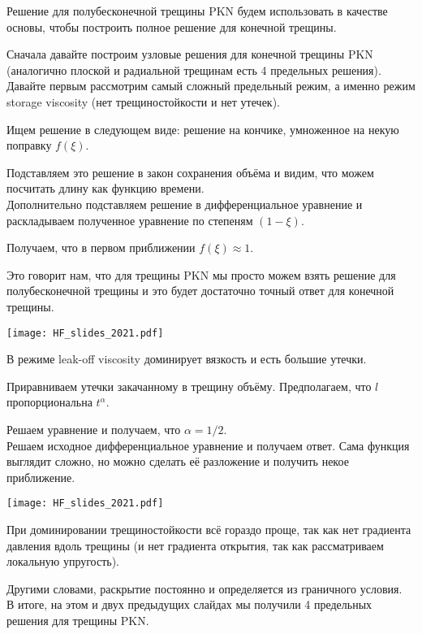 \documentclass[main.tex]{subfiles}
\begin{document}
Решение для полубесконечной трещины PKN будем использовать в качестве основы, чтобы построить полное решение для конечной трещины.

Сначала давайте построим узловые решения для конечной трещины PKN (аналогично плоской и радиальной трещинам есть 4 предельных решения).
\\

Давайте первым рассмотрим самый сложный предельный режим, а именно режим storage viscosity (нет трещиностойкости и нет утечек).

Ищем решение в следующем виде: решение на кончике, умноженное на некую поправку $f(\xi)$.

Подставляем это решение в закон сохранения объёма и видим, что можем посчитать длину как функцию времени.
\\

Дополнительно подставляем решение в дифференциальное уравнение и раскладываем полученное уравнение по степеням $(1-\xi)$.

Получаем, что в первом приближении $f(\xi)\approx1$.

Это говорит нам, что для трещины PKN мы просто можем взять решение для полубесконечной трещины и это будет достаточно точный ответ для конечной трещины.

\texttt{[image: HF\_slides\_2021.pdf]}

В режиме leak-off viscosity доминирует вязкость и есть большие утечки.

Приравниваем утечки закачанному в трещину объёму.
Предполагаем, что $l$ пропорциональна $t^\alpha$.

Решаем уравнение и получаем, что $\alpha=1/2$.
\\

Решаем исходное дифференциальное уравнение и получаем ответ.
Сама функция выглядит сложно, но можно сделать её разложение и получить некое приближение.

\texttt{[image: HF\_slides\_2021.pdf]}

При доминировании трещиностойкости всё гораздо проще, так как нет градиента давления вдоль трещины (и нет градиента открытия, так как рассматриваем локальную упругость).

Другими словами, раскрытие постоянно и определяется из граничного условия.
\\

В итоге, на этом и двух предыдущих слайдах мы получили 4 предельных решения для трещины PKN.
\end{document}
